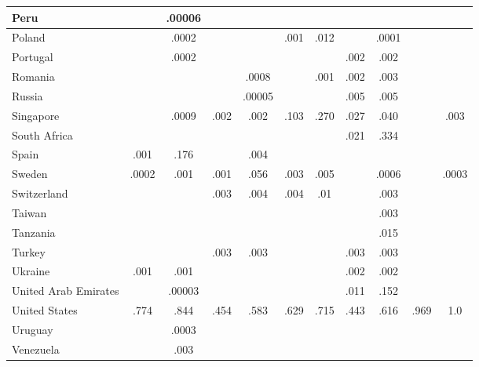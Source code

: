 \begin{table*}[h!]
\begin{tabular}{|P{37mm}|cc|cc|cc|cc|cc|}
Peru             &     &.00006   &     &  &   &   &   &     &  & \\\hline
Poland             &    &.0002   &     &  &.001    &.012   &   &.0001     &  & \\\hline
Portugal             &    &.0002   &     &  &   &   &.002    &.002     &  & \\\hline
Romania             &     &   &     &.0008  &   &.001   &.002    &.003     &  & \\\hline
Russia             &    &  &     &.00005  &   &   &.005   &.005     &  & \\\hline
Singapore             &    &.0009   &.002     &.002  &.103    &.270   &.027    &.040     &  &.003 \\\hline
South Africa             &    &   &     &  &   &   &.021    &.334     &  & \\\hline
Spain             &.001     &.176   &    &.004  &   &   &   &     &  & \\\hline
Sweden             &.0002     &.001   &.001     &.056  &.003    &.005   &   &.0006     &  &.0003 \\\hline
Switzerland             &     &   &.003     &.004  &.004   &.01   &   &.003     &  & \\\hline
Taiwan             &     &   &     &  &   &  &    &.003     &  & \\\hline
Tanzania             &    &   &     &  &   &   &   &.015     &  & \\\hline
Turkey             &     &   &.003     &.003  &   &   &.003    &.003     &  & \\\hline
Ukraine             &.001     &.001   &     &  &    &   &.002    &.002     &  & \\\hline
United Arab Emirates             &     &.00003   &     &  &   &   &.011    &.152     &  & \\\hline
United States             &.774     &.844   &.454     &.583  &.629    &.715   &.443    &.616     &.969  &1.0 \\\hline
Uruguay             &     &.0003   &    &  &    &   &   &     &  & \\\hline
Venezuela             &    &.003   &     &  &   &   &   &     &  & \\\hline
\end{tabular}
\label{tab:complete_transit_host}
\end{table*}


